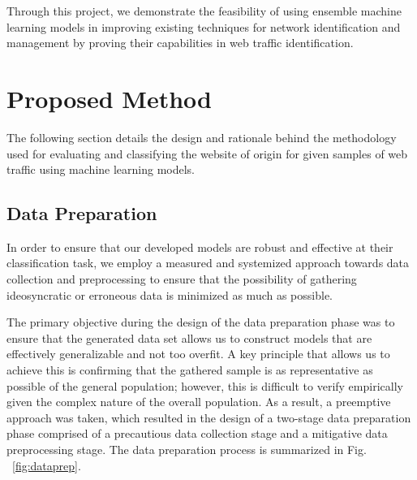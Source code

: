 \documentclass[10pt,sigconf,letterpaper,nonacm]{acmart}
\begin{document}
Through this project, we demonstrate the feasibility of using ensemble machine learning models in improving existing techniques for network identification and management by proving their capabilities in web traffic identification.


\section{Proposed Method}

The following section details the design and rationale behind the methodology used for evaluating and classifying the website of origin for given samples of web traffic using machine learning models.

\subsection{Data Preparation}

In order to ensure that our developed models are robust and effective at their classification task, we employ a measured and systemized approach towards data collection and preprocessing to ensure that the possibility of gathering ideosyncratic or erroneous data is minimized as much as possible.

The primary objective during the design of the data preparation phase was to ensure that the generated data set allows us to construct models that are effectively generalizable and not too overfit.
A key principle that allows us to achieve this is confirming that the gathered sample is as representative as possible of the general population; however, this is difficult to verify empirically given the complex nature of the overall population.
As a result, a preemptive approach was taken, which resulted in the design of a two-stage data preparation phase comprised of a precautious data collection stage and a mitigative data preprocessing stage.
The data preparation process is summarized in Fig. ~\ref{fig:dataprep}.
\end{document}
